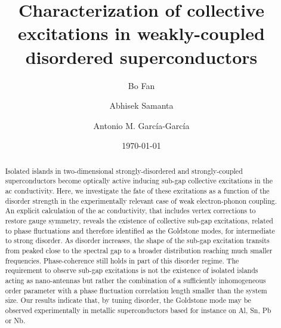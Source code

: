 \documentclass[Collective.tex]{revtex4-1}
\begin{document}
	
\title{Characterization of collective excitations in weakly-coupled disordered superconductors}
\author{Bo Fan}
\author{Abhisek Samanta}
\author{Antonio M. Garc\'ia-Garc\'ia}

\date{\today }

\begin{abstract}
	Isolated islands in two-dimensional strongly-disordered and strongly-coupled superconductors become optically active inducing sub-gap collective excitations in the ac conductivity. Here, we investigate the fate of these excitations as a function of the disorder strength in the  experimentally relevant case of weak electron-phonon coupling. An explicit calculation of the ac conductivity, that includes vertex corrections to restore gauge symmetry, reveals the existence of collective sub-gap excitations, related to phase fluctuations and therefore identified as the Goldstone modes, for intermediate to strong disorder. As disorder increases, the shape of the sub-gap excitation transits from peaked close to the spectral gap to a broader distribution reaching much smaller frequencies. Phase-coherence still holds in part of this disorder regime. The requirement to observe sub-gap excitations is not the existence of isolated islands acting as nano-antennas but rather the combination of a sufficiently inhomogeneous order parameter with a phase fluctuation correlation length smaller than the system size. Our results indicate that, by tuning disorder, the Goldstone mode may be observed experimentally in metallic superconductors based for instance on Al, Sn, Pb or Nb.  
\end{abstract}
\maketitle
\newpage
\end{document}
